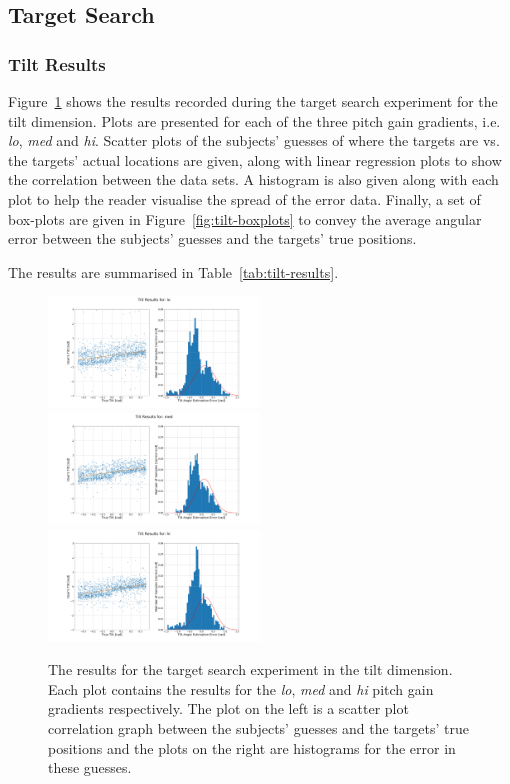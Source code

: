 \documentclass[format=sigconf, review=true, screen=true, anonymous=true]{acmart}
\begin{document}
\subsection{Target Search}

\subsubsection{Tilt Results}

Figure~\ref{fig:tilt-err} shows the results recorded during the target search experiment for the tilt dimension. Plots are presented for each of the three pitch gain gradients, i.e. \emph{lo}, \emph{med} and \emph{hi}. Scatter plots of the subjects' guesses of where the targets are vs. the targets' actual locations are given, along with linear regression plots to show the correlation between the data sets. A histogram is also given along with each plot to help the reader visualise the spread of the error data. Finally, a set of box-plots are given in Figure~\ref{fig:tilt-boxplots} to convey the average angular error between the subjects' guesses and the targets' true positions.

The results are summarised in Table~\ref{tab:tilt-results}.

\begin{figure}
  \centering
  \includegraphics[width=0.5\textwidth]{figures/tilt_err_lo.png}
  \includegraphics[width=0.5\textwidth]{figures/tilt_err_med.png}
  \includegraphics[width=0.5\textwidth]{figures/tilt_err_hi.png}
  \caption{The results for the target search experiment in the tilt dimension. Each plot contains the results for the \emph{lo}, \emph{med} and \emph{hi} pitch gain gradients respectively. The plot on the left is a scatter plot correlation graph between the subjects' guesses and the targets' true positions and the plots on the right are histograms for the error in these guesses. }
  \label{fig:tilt-err}
\end{figure}
\end{document}
